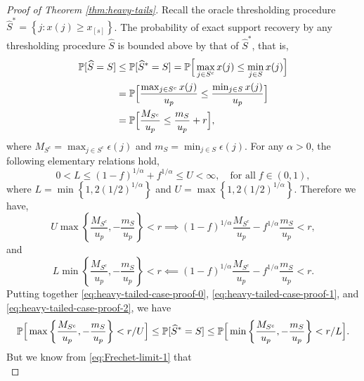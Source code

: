 \begin{proof}[Proof of Theorem \ref{thm:heavy-tails}]
Recall the oracle thresholding procedure $\widehat{S}^* = \left\{j:x(j) \ge x_{[s]}\right\}$.
The probability of exact support recovery by any thresholding procedure $\widehat{S}$ is bounded above by that of $\widehat{S}^*$, that is,
\begin{align}
    \P[\widehat{S}=S] &\le \P[\widehat{S}^*=S] 
        = \P\Big[\max_{j\in S^c}x(j) \le \min_{j\in S}x(j)\Big] \nonumber \\
        &= \P\Big[\frac{\max_{j\in S^c}x(j)}{u_p} \le \frac{\min_{j\in S}x(j)}{u_p}\Big] \nonumber \\
        &= \P\Big[\frac{M_{S^c}}{u_p} \le \frac{m_S}{u_p} + r\Big], \label{eq:heavy-tailed-case-proof-0}
\end{align}
where $M_{S^c} = \max_{j\in S^c}\epsilon(j)$ and $m_S = \min_{j\in S}\epsilon(j)$.
For any $\alpha > 0$, the following elementary relations hold,
\begin{equation*}
    0 < L \le (1-f)^{1/\alpha} + f^{1/\alpha} \le U < \infty, \quad \text{for all} \; f\in(0,1),
\end{equation*}
where $L = \min\left\{1, 2(1/2)^{1/\alpha}\right\}$ and $U = \max\left\{1, 2(1/2)^{1/\alpha}\right\}$.
Therefore we have,
\begin{equation} \label{eq:heavy-tailed-case-proof-1}
    U\max\left\{\frac{M_{S^c}}{u_p}, -\frac{m_S}{u_p}\right\} < r
    \implies
    (1-f)^{1/\alpha}\frac{M_{S^c}}{u_p} - f^{1/\alpha}\frac{m_S}{u_p} < r,
\end{equation}
and 
\begin{equation} \label{eq:heavy-tailed-case-proof-2}
    L\min\left\{\frac{M_{S^c}}{u_p}, -\frac{m_S}{u_p}\right\} < r
    \impliedby
    (1-f)^{1/\alpha}\frac{M_{S^c}}{u_p} - f^{1/\alpha}\frac{m_S}{u_p} < r.
\end{equation}
Putting together \eqref{eq:heavy-tailed-case-proof-0}, \eqref{eq:heavy-tailed-case-proof-1}, and \eqref{eq:heavy-tailed-case-proof-2}, we have
\begin{equation} \label{eq:heavy-tailed-case-proof-3}
    \P\Big[\max\left\{\frac{M_{S^c}}{u_p}, -\frac{m_S}{u_p}\right\} < r/U\Big]
    \le \P[\widehat{S}^*=S]
    \le \P\Big[\min\left\{\frac{M_{S^c}}{u_p}, -\frac{m_S}{u_p}\right\} < r/L\Big].
\end{equation}
But we know from \eqref{eq:Frechet-limit-1} that 
\begin{equation} \label{eq:heavy-tailed-case-proof-4}

\end{equation}
\end{proof}
